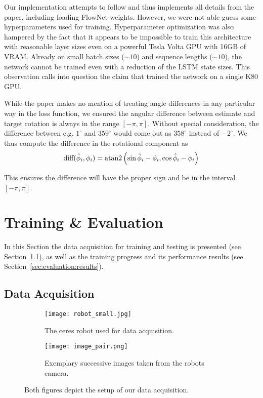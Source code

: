 \documentclass[a4paper,11pt]{article}
\begin{document}
Our implementation attempts to follow \cite{wang2017deepvo} and thus implements
all details from the paper, including loading FlowNet weights.
However, we were not able guess some hyperparameters
used for training. Hyperparameter optimization was also hampered by the fact
that it appears to be impossible to train this architecture with reasonable
layer sizes even on a powerful Tesla Volta GPU with 16GB of VRAM. Already on
small batch sizes ($\sim 10$) and sequence lengths ($\sim 10$), the network cannot be
trained even with a reduction of the LSTM state sizes. This observation calls
into question the claim that \cite{wang2017deepvo} trained the network on a
single K80 GPU.

While the paper makes no mention of treating angle differences in any particular
way in the loss function, we ensured the angular difference between estimate and
target rotation is always in the range $[-\pi,\pi]$. Without special
consideration, the difference between e.g. $1^\circ$ and $359^\circ$ would come out as
$358^\circ$ instead of $-2^\circ$. We thus compute the difference in the rotational
component as
\begin{align}
    \text{diff}(\hat{\phi}_i,\phi_i) = \operatorname{atan2}\left(\sin\hat{\phi}_i - \phi_i,
    \cos{\hat{\phi}_i -\phi_i}\right)
\end{align}

This ensures the difference will have the proper sign and be in the interval
$[-\pi,\pi]$.

\section{Training \& Evaluation}
\label{sec:evaluation}
In this Section the data acquisition for training and testing is presented (see Section~\ref{sec:evaluation:data}), as well as the training progress and its performance results (see Section~\ref{sec:evaluation:results}).


\subsection{Data Acquisition}
\label{sec:evaluation:data}
\begin{figure}[htb]
    \centering
    \begin{subfigure}[t]{0.6\linewidth}
            \centering
            \texttt{[image: robot\_small.jpg]}
            \caption[]{The ceres robot used for data acquisition.}
            \label{fig:robot}
    \end{subfigure}
    \begin{subfigure}[t]{0.39\linewidth}
            \centering
            \texttt{[image: image\_pair.png]}
            \caption[]{Exemplary successive images taken from the robots camera.}
            \label{fig:camera_images}
    \end{subfigure}
    \caption[]{Both figures depict the setup of our data acquisition.}
    \label{fig:setup}
\end{figure}
\end{document}
